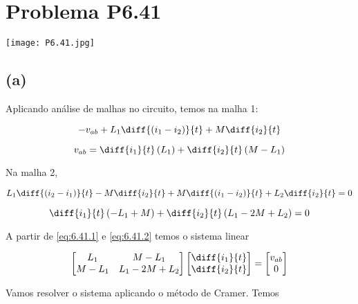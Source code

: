 
\section*{Problema P6.41}

\renewcommand*\thesection{6.41}

\begin{center}
    \texttt{[image: P6.41.jpg]}
\end{center}

\subsection*{(a)}

Aplicando análise de malhas no circuito, temos na malha 1:

\[ -v_{ab} + L_1\diff{(i_1 - i_2)}{t} + M\diff{i_2}{t} \]   

\begin{equation}\label{eq:6.41.1}
    v_{ab} = \diff{i_1}{t}\left(L_1\right) + \diff{i_2}{t}\left(M - L_1\right)
\end{equation}

Na malha 2,

\[ L_1\diff{(i_2 - i_1)}{t} - M\diff{i_2}{t} + M\diff{(i_1 - i_2)}{t} + L_2\diff{i_2}{t} = 0 \]   

\begin{equation}\label{eq:6.41.2}
    \diff{i_1}{t}\left(-L_1 + M\right) + \diff{i_2}{t}\left(L_1 - 2M + L_2\right) = 0
\end{equation}

A partir de \eqref{eq:6.41.1} e \eqref{eq:6.41.2} temos o sistema linear

\begingroup
\renewcommand*{\arraystretch}{2}

\[
    \begin{bmatrix}
        L_1 & M - L_1    \\
        M - L_1    & L_1 - 2M + L_2
    \end{bmatrix}
    \begin{bmatrix}
        \diff{i_1}{t} \\
        \diff{i_2}{t}
    \end{bmatrix}
    =
    \begin{bmatrix}
        v_{ab} \\
        0
    \end{bmatrix}
\]

\endgroup

Vamos resolver o sistema aplicando o método de Cramer. Temos

